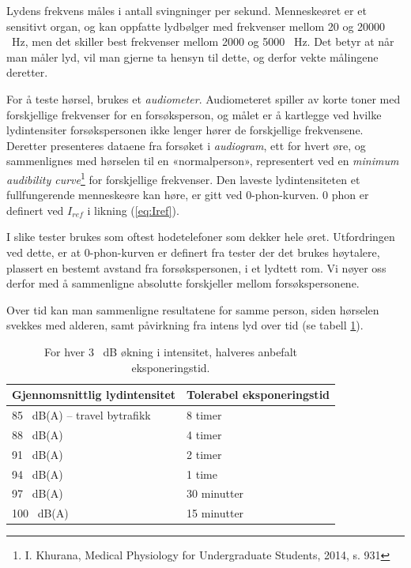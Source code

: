 \documentclass[norsk, twocolumn,letterpaper,11pt,fleqn]{extarticle}
\begin{document}
Lydens frekvens måles i antall svingninger per sekund. 
Menneskeøret er et sensitivt organ, og kan oppfatte lydbølger med
frekvenser mellom \num{20} og \num{20 000} \SI{}{\Hz}, 
men det skiller best frekvenser mellom 
\num{2 000} og \num{5000} \SI{}{\Hz}. Det betyr at når man måler lyd, vil man gjerne
ta hensyn til dette, og derfor vekte målingene deretter.

For å teste hørsel, brukes et \textit{audiometer}. 
Audiometeret spiller av korte toner
med forskjellige frekvenser for en forsøksperson, og målet er å kartlegge ved hvilke
lydintensiter forsøkspersonen ikke lenger hører de forskjellige frekvensene.
Deretter presenteres dataene fra forsøket i \textit{audiogram}, ett for hvert øre,
og sammenlignes med hørselen til en «normalperson», 
representert ved en 
\textit{minimum audibility curve}\footnote{I. Khurana, 
Medical Physiology for Undergraduate Students, 2014, s. 931}
for forskjellige frekvenser. Den laveste lydintensiteten et fullfungerende menneskeøre
kan høre, er gitt ved \num{0}-phon-kurven. \num{0} phon er definert
ved $I_{ref}$ i likning (\ref{eq:Iref}).

I slike tester brukes som oftest hodetelefoner som dekker hele øret.
Utfordringen ved dette, er at \num{0}-phon-kurven er definert fra tester der det brukes
høytalere, plassert en bestemt avstand fra forsøkspersonen, i et lydtett rom.
Vi nøyer oss derfor med å sammenligne absolutte forskjeller mellom forsøkspersonene.

Over tid kan man sammenligne resultatene for samme person, siden
hørselen svekkes med alderen, samt påvirkning fra intens lyd over tid 
(se tabell \ref{tab:tab1}).

\begin{table}[h!]
	\begin{tabular}{l|l}
		\hline
		Gjennomsnittlig lydintensitet & Tolerabel eksponeringstid\\
		\hline\hline
		85 \SI{}{\dB}(A) – travel bytrafikk & 8 timer \\
		\hline
		88 \SI{}{\dB}(A) & 4 timer \\
		\hline
		91 \SI{}{\dB}(A) & 2 timer \\
		\hline
		94 \SI{}{\dB}(A) & 1 time \\
		\hline
		97 \SI{}{\dB}(A) & 30 minutter \\
		\hline
		100 \SI{}{\dB}(A) & 15 minutter \\
		\hline
	\end{tabular}
			\caption[]{For hver 3 \SI{}{\dB} økning i intensitet, halveres anbefalt eksponeringstid\footnotemark[2].}							
	\label{tab:tab1}
\end{table}
\end{document}
